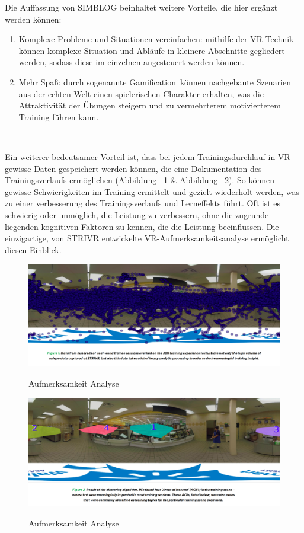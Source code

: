 Die Auffassung von SIMBLOG \citep{16} beinhaltet weitere Vorteile, die hier ergänzt werden können:

\begin{enumerate}
\item Komplexe Probleme und Situationen vereinfachen: mithilfe der VR Technik können komplexe Situation und Abläufe in kleinere Abschnitte gegliedert werden, sodass diese im einzelnen angesteuert werden können.
\item Mehr Spaß: durch sogenannte \glqq Gamification\grqq\ können nachgebaute Szenarien aus der echten Welt einen spielerischen Charakter erhalten, was die Attraktivität der Übungen steigern und zu vermehrterem motivierterem Training führen kann.
\end{enumerate}\

Ein weiterer bedeutsamer Vorteil ist, dass bei jedem Trainingsdurchlauf in VR gewisse Daten gespeichert werden können, die eine Dokumentation des Trainingsverlaufs ermöglichen (Abbildung ~\ref{fig:intentionanalys1} \& Abbildung ~\ref{fig:intentionanalys2}). So können gewisse Schwierigkeiten im Training ermittelt und gezielt wiederholt werden, was zu einer verbesserung des Trainingsverlaufs und Lerneffekts führt. \glqq Oft ist es schwierig oder unmöglich, die Leistung zu verbessern, ohne die zugrunde liegenden kognitiven Faktoren zu kennen, die die Leistung beeinflussen. Die einzigartige, von STRIVR entwickelte VR-Aufmerksamkeitsanalyse ermöglicht diesen Einblick.\grqq\ \citep{18}

\begin{figure}[ht]
\vspace*{1em}
\centering
\caption{Aufmerksamkeit Analyse}
\includegraphics[width=\textwidth]{images/intentionanalys1.png}
\label{fig:intentionanalys1}
\end{figure}

\begin{figure}[ht]
\vspace*{1em}
\centering
\caption{Aufmerksamkeit Analyse}
\includegraphics[width=\textwidth]{images/intentionanalys2.png}
\label{fig:intentionanalys2} 
\end{figure}

